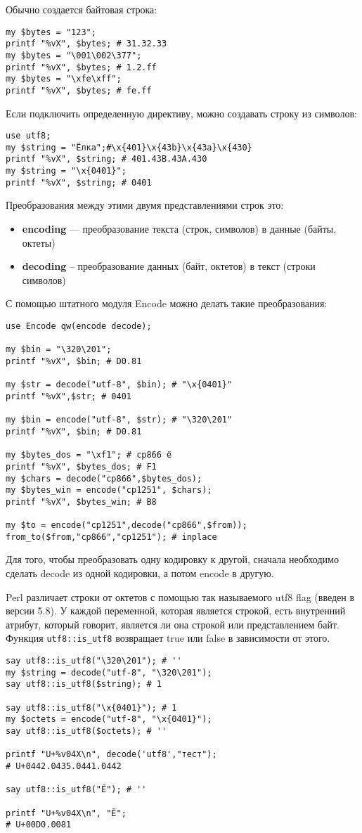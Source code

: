 Обычно создается байтовая строка:
\begin{verbatim}
my $bytes = "123";
printf "%vX", $bytes; # 31.32.33
my $bytes = "\001\002\377";
printf "%vX", $bytes; # 1.2.ff
my $bytes = "\xfe\xff";
printf "%vX", $bytes; # fe.ff
\end{verbatim}
Если подключить определенную директиву, можно создавать строку из символов:
\begin{verbatim}
use utf8;
my $string = "Ёлка";#\x{401}\x{43b}\x{43a}\x{430}
printf "%vX", $string; # 401.43B.43A.430
my $string = "\x{0401}";
printf "%vX", $string; # 0401 
\end{verbatim}
Преобразования между этими двумя представлениями строк это:
\begin{itemize}
    \item \textbf{encoding} --- преобразование текста (строк, символов) в данные (байты, октеты)
    \item \textbf{decoding} -- преобразование данных (байт, октетов) в текст (строки символов)
\end{itemize}
С помощью штатного модуля Encode можно делать такие преобразования:
\begin{verbatim}
use Encode qw(encode decode);

my $bin = "\320\201";
printf "%vX", $bin; # D0.81

my $str = decode("utf-8", $bin); # "\x{0401}"
printf "%vX",$str; # 0401

my $bin = encode("utf-8", $str); # "\320\201"
printf "%vX", $bin; # D0.81

my $bytes_dos = "\xf1"; # cp866 ё
printf "%vX", $bytes_dos; # F1
my $chars = decode("cp866",$bytes_dos);
my $bytes_win = encode("cp1251", $chars);
printf "%vX", $bytes_win; # B8

my $to = encode("cp1251",decode("cp866",$from));
from_to($from,"cp866","cp1251"); # inplace
\end{verbatim}
Для того, чтобы преобразовать одну кодировку к другой, сначала необходимо сделать decode из одной кодировки, а потом encode в другую.

Perl различает строки от октетов с помощью так называемого utf8 flag (введен в версии 5.8). У каждой переменной, которая является строкой, есть внутренний атрибут, который говорит, является ли она строкой или представлением байт. Функция \verb|utf8::is_utf8| возвращает true или false в зависимости от этого.
\begin{verbatim}
say utf8::is_utf8("\320\201"); # ''
my $string = decode("utf-8", "\320\201");
say utf8::is_utf8($string); # 1

say utf8::is_utf8("\x{0401}"); # 1
my $octets = encode("utf-8", "\x{0401}");
say utf8::is_utf8($octets); # ''

printf "U+%v04X\n", decode('utf8',"тест");
# U+0442.0435.0441.0442

say utf8::is_utf8("Ё"); # ''

printf "U+%v04X\n", "Ё";
# U+00D0.0081
\end{verbatim}

